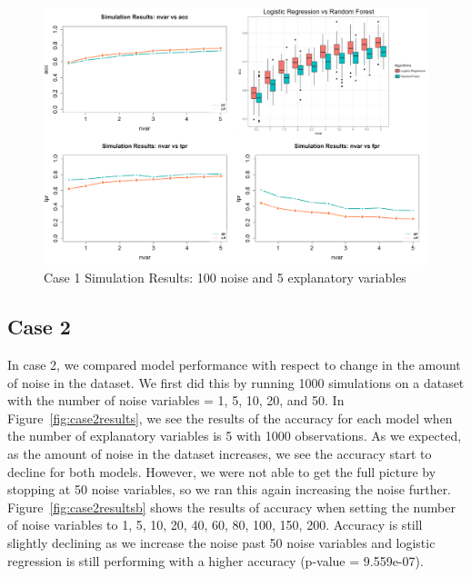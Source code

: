 \documentclass{llncs}
\begin{document}
\begin{figure}
\centering
\includegraphics[scale=0.55]{case1_b.png}
\caption{Case 1 Simulation Results: 100 noise and 5 explanatory variables}
\label{fig:case1resultsb}
\end{figure}

\subsection{Case 2}
\noindent 
In case 2, we compared model performance with respect to change in the amount of noise in the dataset. We first did this by running 1000 simulations on a dataset with the number of noise variables = 1, 5, 10, 20, and 50.  In Figure~\ref{fig:case2results}, we see the results of the accuracy for each model when the number of explanatory variables is 5 with 1000 observations.  As we expected, as the amount of noise in the dataset increases, we see the accuracy start to decline for both models. However, we were not able to get the full picture by stopping at 50 noise variables, so we ran this again increasing the noise further.  Figure~\ref{fig:case2resultsb} shows the results of accuracy when setting the number of noise variables to 1, 5, 10, 20, 40, 60, 80, 100, 150, 200.  Accuracy is still slightly declining as we increase the noise past 50 noise variables and logistic regression is still performing with a higher accuracy (p-value = 9.559e-07).
\end{document}
